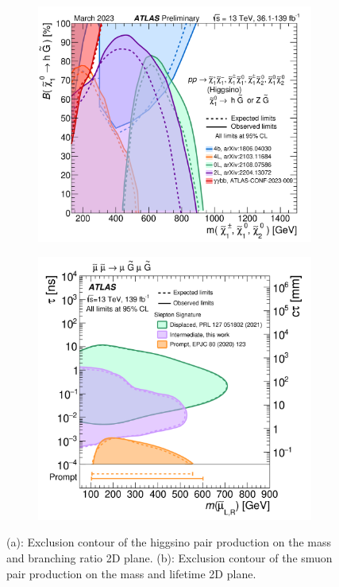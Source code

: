 \documentclass{moriond}
\begin{document}
\begin{figure}[htp]
     \centering
     \begin{subfigure}[b]{0.35\textwidth}
         \centering
         \includegraphics[width=\textwidth]{bbyy}
         \caption{}
         \label{fig:bbyy}
     \end{subfigure}
     \begin{subfigure}[b]{0.32\textwidth}
         \centering
         \includegraphics[width=\textwidth]{micro}
         \caption{}
         \label{fig:micro}
     \end{subfigure}
        \caption{(a): Exclusion contour of the higgsino pair production on the mass and branching ratio 2D plane\protect\cite{bbyy}. (b): Exclusion contour of the smuon pair production on the mass and lifetime 2D plane\protect\cite{micro}.}
        \label{fig:limits2}
\end{figure}
\end{document}
